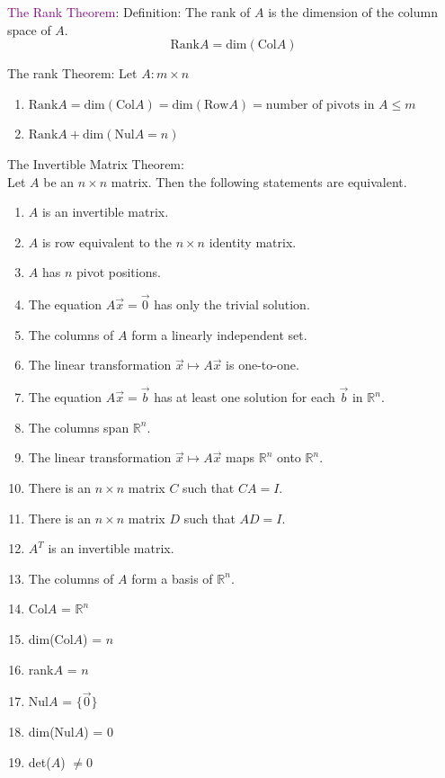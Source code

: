 \documentclass[12pt]{article}
\begin{document}
\textcolor{purple}{The Rank Theorem}:
Definition: The rank of $A$ is the dimension of the column space of $A$.
$$\text{Rank}A = \text{dim}(\text{Col}A)$$

The rank Theorem: Let $A : m\times n$
\begin{enumerate}
    \item $\text{Rank}A = \text{dim}(\text{Col}A) = \text{dim}(\text{Row}A) = \text{number of pivots in }A \leq m $
    \item $\text{Rank}A + \text{dim}(\text{Nul}A = n)$
\end{enumerate}


The Invertible Matrix Theorem:\\
Let $A$ be an $n\times n$ matrix. Then the following statements are equivalent.
\begin{enumerate}
    \item $A$ is an invertible matrix.
    \item $A$ is row equivalent to the $n\times n$ identity matrix.
    \item $A$ has $n$ pivot positions.
    \item The equation $A\vec{x} = \vec{0}$ has only the trivial solution.
    \item The columns of $A$ form a linearly independent set.
    \item The linear transformation $\vec{x}\longmapsto A\vec{x}$ is one-to-one.
    \item The equation $A\vec{x} = \vec{b}$ has at least one solution for each $\vec{b}$ in $\mathbb{R}^n$.
    \item The columns span $\mathbb{R}^n$.
    \item The linear transformation $\vec{x} \longmapsto A\vec{x}$ maps $\mathbb{R}^n$ onto $\mathbb{R}^n$.
    \item There is an $n \times n$ matrix $C$ such that $CA = I$.
    \item There is an $n \times n$ matrix $D$ such that $AD = I$.
    \item $A^T$ is an invertible matrix.
    \item The columns of $A$ form a basis of $\mathbb{R}^n$.
    \item Col$A$ = $\mathbb{R}^n$
    \item dim(Col$A$) = $n$
    \item rank$A$ = $n$
    \item Nul$A$ = $\{\vec{0}\}$
    \item dim(Nul$A$) = 0
    \item det($A$) $\neq 0$
\end{enumerate}
\end{document}
